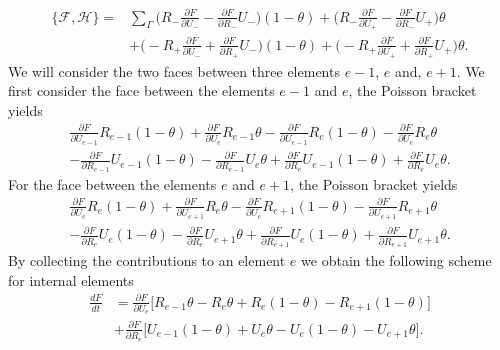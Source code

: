 \documentclass[a4paper,11pt]{article}
\begin{document}
  \begin{equation}
\begin{aligned}
 \{ \mathcal{F},  \mathcal{H}\} = & \sum_\Gamma \bigg ( R_-\frac{\partial F}{\partial U_-} - \frac{\partial F}{\partial R_-} U_-\bigg  ) (1-\theta) +  \bigg  ( R_-\frac{\partial F}{\partial U_+} - \frac{\partial F}{\partial R_-} U_+\bigg  ) \theta\\
 & + \bigg  ( -  R_+\frac{\partial F}{\partial U_-} + \frac{\partial F}{\partial R_+} U_-\bigg  )  (1-\theta) + \bigg  ( -  R_+\frac{\partial F}{\partial U_+} + \frac{\partial F}{\partial R_+}U_+\bigg  ) \theta.
 \end{aligned}
 \end{equation}
We will consider the two faces between three elements $e-1$, $e$ and, $e+ 1$. We first consider the face between the elements  $e-1$ and  $e$, the Poisson bracket yields
\begin{equation}
\begin{aligned}
\frac{\partial F}{\partial U_{e-1}}R_{e-1}(1-\theta) + \frac{\partial F}{\partial U_{e}}R_{e-1}\theta - \frac{\partial F}{\partial U_{e-1}}R_{e}(1-\theta) -\frac{\partial F}{\partial U_{e}}R_{e}\theta\\
-\frac{\partial F}{\partial R_{e-1}}U_{e-1}(1-\theta) -\frac{\partial F}{\partial R_{e-1}}U_{e}\theta +\frac{\partial F}{\partial R_{e}}U_{e-1}(1-\theta) +\frac{\partial F}{\partial R_{e}}U_{e}\theta.
\end{aligned}
\end{equation}
For the face between the elements  $e$ and  $e+1$, the Poisson bracket yields
\begin{equation}
\begin{aligned}
\frac{\partial F}{\partial U_{e}}R_{e}(1-\theta) + \frac{\partial F}{\partial U_{e+1}}R_{e}\theta - \frac{\partial F}{\partial U_{e}}R_{e+1}(1-\theta) -\frac{\partial F}{\partial U_{e+1}}R_{e+1}\theta\\
-\frac{\partial F}{\partial R_{e}}U_{e}(1-\theta) -\frac{\partial F}{\partial R_{e}}U_{e+1}\theta +\frac{\partial F}{\partial R_{e+1}}U_{e}(1-\theta) +\frac{\partial F}{\partial R_{e+1}}U_{e+1}\theta.
\end{aligned}
\end{equation}
By collecting the contributions to an element $e$ we obtain the following scheme for internal elements
\begin{equation}
\begin{aligned}
\frac{d F}{d t} & =\frac{\partial F}{\partial U_{e}}\bigg [    R_{e-1}\theta - R_{e}\theta + R_{e}(1-\theta) - R_{e+1}(1-\theta)                         \bigg]\\
&+\frac{\partial F}{\partial R_{e}}\bigg [    U_{e-1}(1-\theta)   + U_{e}\theta    - U_{e}(1-\theta)    - U_{e+1}\theta        \bigg].
\end{aligned}
\end{equation}
\end{document}
